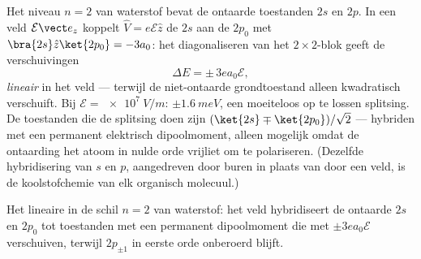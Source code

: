 \begin{example}\label{ex:b3:perturbation-theory:stark}
Het niveau $n = 2$ van waterstof bevat de ontaarde toestanden $2s$ en
$2p$. In een veld $\mathcal E\vect e_z$ koppelt $\hat V = e\mathcal E\hat z$ de $2s$ aan de $2p_0$ met $\bra{2s}\hat z\ket{2p_0} = -3a_0$: het
diagonaliseren van het $2\times2$-blok geeft de verschuivingen
\[
\Delta E = \pm\,3e a_0\mathcal E ,
\]
\emph{lineair} in het veld --- terwijl de niet-ontaarde grondtoestand
alleen kwadratisch verschuift. Bij $\mathcal E = \qty{e7}{V/m}$: $\pm
\qty{1.6}{meV}$, een moeiteloos op te lossen splitsing. De toestanden die
de splitsing doen zijn $(\ket{2s} \mp \ket{2p_0})/\sqrt2$ --- hybriden
met een permanent elektrisch dipoolmoment, alleen mogelijk omdat de
ontaarding het atoom in nulde orde vrijliet om te polariseren. (Dezelfde
hybridisering van $s$ en $p$, aangedreven door buren in plaats van door
een veld, is de koolstofchemie van elk organisch molecuul.)
\end{example}

\begin{omfigure}

{\small Het lineaire  in de schil $n = 2$ van waterstof: het
veld hybridiseert de ontaarde $2s$ en $2p_0$ tot toestanden met een
permanent dipoolmoment die met $\pm3ea_0\mathcal E$ verschuiven, terwijl
$2p_{\pm1}$ in eerste orde onberoerd blijft.}
\end{omfigure}


